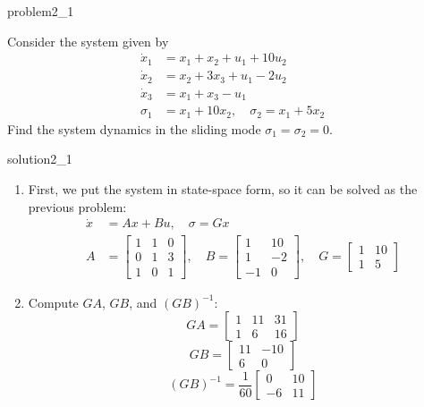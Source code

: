 \begin{problem}{2.1}{problem2_1}

Consider the system given by
\[
	\begin{aligned}
		\dot{x}_1 & = x_1 + x_2 + u_1 + 10u_2                  \\
		\dot{x}_2 & = x_2 + 3x_3 + u_1 - 2u_2                  \\
		\dot{x}_3 & = x_1 + x_3 - u_1                          \\
		\sigma_1  & = x_1 + 10x_2, \quad \sigma_2 = x_1 + 5x_2
	\end{aligned}
\]
Find the system dynamics in the sliding mode $\sigma_1 = \sigma_2 = 0$.
\end{problem}

\begin{solution}{}{solution2_1}
	\begin{enumerate}
		\item First, we put the system in state-space form, so it can be solved as the previous problem:
		      \[
			      \begin{aligned}
				      \dot{x} & = Ax + Bu, \quad \sigma = Gx \\
				      A       & = \begin{bmatrix}
					                  1 & 1 & 0 \\
					                  0 & 1 & 3 \\
					                  1 & 0 & 1
				                  \end{bmatrix}, \quad
				      B       = \begin{bmatrix}
					                1  & 10 \\
					                1  & -2 \\
					                -1 & 0
				                \end{bmatrix}, \quad
				      G       = \begin{bmatrix}
					                1 & 10 \\
					                1 & 5
				                \end{bmatrix}
			      \end{aligned}
		      \]
		\item Compute \( GA \), \( GB \), and \( (GB)^{-1} \):
		      \[
			      GA = \begin{bmatrix}
				      1 & 11 & 31 \\
				      1 & 6  & 16
			      \end{bmatrix}
		      \]
		      \[
			      GB = \begin{bmatrix}
				      11 & -10 \\
				      6  & 0
			      \end{bmatrix}
		      \]
		      \[
			      (GB)^{-1} = \frac{1}{60}
			      \begin{bmatrix}
				      0  & 10 \\
				      -6 & 11
			      \end{bmatrix}
		      \]



\end{enumerate}
\end{solution}
